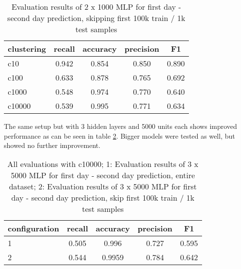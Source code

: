 \begin{table}[H]
  \centering
    \begin{tabular}{lcccc} \toprule
        {clustering} & {recall} & {accuracy} & {precision} & {F1}  \\ \midrule
        {c10}  & 0.942  & 0.854 & 0.850  &  0.890 \\ 
        {c100}  & 0.633  & 0.878 & 0.765  &  0.692 \\ 
        {c1000}  & 0.548  & 0.974 & 0.770  &  0.640 \\ 
        {c10000}  &  0.539  & 0.995 & 0.771  &  0.634 \\ \midrule
        
    \end{tabular}
  \caption{Evaluation results of 2 x 1000 MLP for first day - second day  prediction, skipping first 100k train / 1k test samples}  \label{tab:mytable1}
\end{table}



The same setup but with 3 hidden layers and 5000 units each shows improved performance as can be seen in table \ref{tab:mytable3}. Bigger models were tested as well, but showed no further improvement.


\begin{table}[H]
  \centering
    \begin{tabular}{lcccc} \toprule
        {configuration} & {recall} & {accuracy} & {precision} & {F1}  \\ \midrule
        {1}  & 0.505  & 0.996 &  0.727  & 0.595 \\
        {2} & 0.544  & 0.9959 &  0.784  & 0.642 \\  \midrule
    \end{tabular}
  \caption{All evaluations with c10000; 1: Evaluation results of 3 x 5000 MLP for first day - second day  prediction, entire dataset; 2: Evaluation results of 3 x 5000 MLP for first day - second day prediction, skip first 100k train / 1k test samples}
  \label{tab:mytable3}
\end{table}




